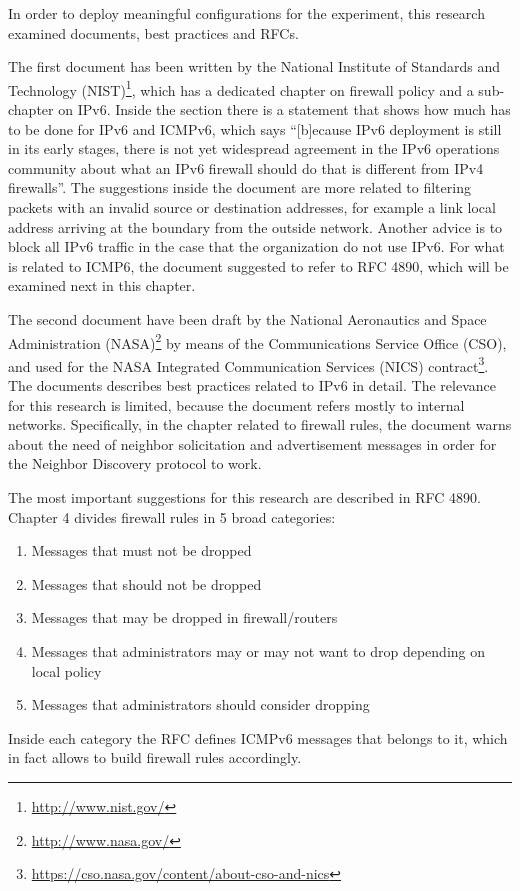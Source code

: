\documentclass[12pt]{article}
\begin{document}
In order to deploy meaningful configurations for the experiment, this research examined documents, best practices and RFCs. 

The first document has been written by the National Institute of Standards and Technology (NIST)\footnote{\url{http://www.nist.gov/}}, which has a dedicated chapter on firewall policy and a sub-chapter on IPv6. Inside the section there is a statement that shows how much has to be done for IPv6 and ICMPv6, which says ``[b]ecause IPv6 deployment is still in its early stages, there is not yet widespread agreement in the IPv6 operations community about what an IPv6 firewall should do that is different from IPv4 firewalls''. The suggestions inside the document are more related to filtering packets with an invalid source or destination addresses, for example a link local address arriving at the boundary from the outside network. Another advice is to block all IPv6 traffic in the case that the organization do not use IPv6. For what is related to ICMP6, the document suggested to refer to RFC 4890, which will be examined next in this chapter.\cite{nist}

The second document have been draft by the National Aeronautics and Space Administration (NASA)\footnote{\url{http://www.nasa.gov/}} by means of the Communications Service Office (CSO), and used for the NASA Integrated Communication Services (NICS) contract\footnote{\url{https://cso.nasa.gov/content/about-cso-and-nics}}. The documents describes best practices related to IPv6 in detail. The relevance for this research is limited, because the document refers mostly to internal networks. Specifically, in the chapter related to firewall rules, the document warns about the need of neighbor solicitation and advertisement messages in order for the Neighbor Discovery protocol to work\cite{nics}.

The most important suggestions for this research are described in RFC 4890. Chapter 4 divides firewall rules in 5 broad categories:
\vspace{-15pt}
\begin{enumerate}[noitemsep,topsep=0pt,partopsep=0pt]
 \item Messages that must not be dropped
 \item Messages that should not be dropped
 \item Messages that may be dropped in firewall/routers
 \item Messages that administrators may or may not want to drop depending on local policy
 \item Messages that administrators should consider dropping
\end{enumerate}
Inside each category the RFC defines ICMPv6 messages that belongs to it, which in fact allows to build firewall rules accordingly\cite{rfc4890}.
\end{document}
